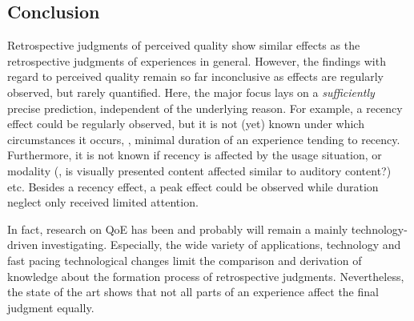 \subsection{Conclusion}
Retrospective judgments of perceived quality show similar effects as the retrospective judgments of experiences in general.
However, the findings with regard to perceived quality remain so far inconclusive as effects are regularly observed, but rarely quantified.
Here, the major focus lays on a \emph{sufficiently} precise prediction, independent of the underlying reason.
For example, a recency effect could be regularly observed, but it is not (yet) known under which circumstances it occurs, \eg, minimal duration of an experience tending to recency.
Furthermore, it is not known if recency is affected by the usage situation, or modality (\eg, is visually presented content affected similar to auditory content?) etc.
Besides a recency effect, a peak effect could be observed while duration neglect only received limited attention.

In fact, research on \ac{QoE} has been and probably will remain a mainly technology-driven investigating.
Especially, the wide variety of applications, technology and fast pacing technological changes limit the comparison and derivation of knowledge about the formation process of retrospective judgments.
Nevertheless, the state of the art shows that not all parts of an experience affect the final judgment equally.
